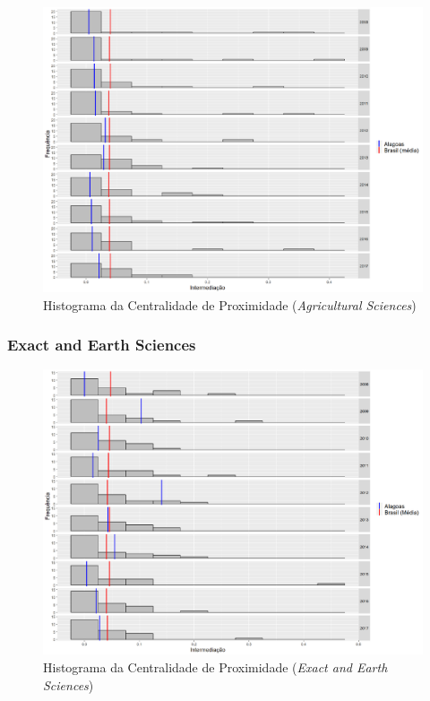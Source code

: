 \begin{figure}[H]
	\centering
	\includegraphics[scale=0.5]{Imagens/agricultural/betweeness-hist.pdf}
	\caption{Histograma da Centralidade de Proximidade (\textit{Agricultural Sciences})}
\end{figure}

\subsubsection{Exact and Earth Sciences}

\begin{figure}[H]
	\centering
	\includegraphics[scale=0.5]{Imagens/exact/betweeness-hist.pdf}
	\caption{Histograma da Centralidade de Proximidade (\textit{Exact and Earth Sciences})}
\end{figure}



